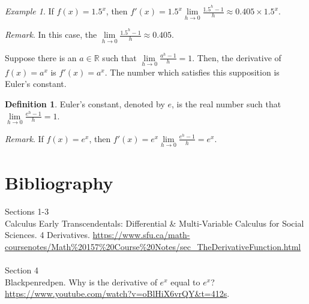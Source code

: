 \documentclass{article}
\theoremstyle{plain}
\theoremstyle{definition}
\newtheorem{definition}{Definition}
\theoremstyle{remark}
\newtheorem{example}{Example}
\newcommand{\R}{\mathbb{R}}
\begin{document}
\begin{example}
    If $f(x)=1.5^x$, then $f'(x)=1.5^x\lim\limits_{h\to0} \frac{1.5^h-1}{h}\approx0.405\times1.5^x$.
\end{example}

\textit{Remark}.
    In this case, the $\lim\limits_{h\to0} \frac{1.5^h-1}{h}\approx0.405$.


\noindent Suppose there is an $a\in\R$ such that $\lim\limits_{h\to0} \frac{a^h-1}{h}=1$. \;Then, the derivative of $f(x)=a^x$ is $f'(x)=a^x$. \;The number which satisfies this supposition is Euler's constant.


\begin{definition}
    Euler's constant, denoted by $e$, is the real number such that $\lim\limits_{h\to0} \frac{e^h-1}{h}=1$.
\end{definition}

\textit{Remark}.
If $f(x)=e^x$, then $f'(x)=e^x\lim\limits_{h\to0} \frac{e^h-1}{h}=e^x$.

\newpage
\section*{Bibliography}
Sections 1-3\\
\indent Calculus Early Transcendentals: Differential \& Multi-Variable Calculus for Social Sciences. 
4 Derivatives.  \url{https://www.sfu.ca/math-coursenotes/Math\%20157\%20Course\%20Notes/sec_TheDerivativeFunction.html}\\\\

\noindent Section 4\\
 \indent Blackpenredpen. 
 Why is the derivative of $e^x$ equal to $e^x$? \;\url{https://www.youtube.com/watch?v=oBlHiX6vrQY&t=412s}.

 
\end{document}
